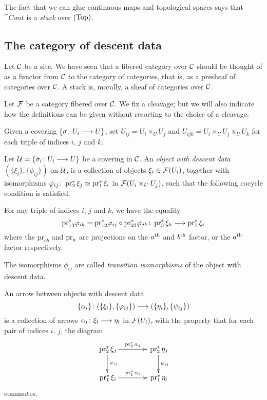\begin{4   STACKS}
\begin{4.1 Descent of objects of fibcats}
The fact that we can glue continuous maps and topological spaces says that $\cat{Cont}$ is a \emph{stack} over $(\mathrm{Top})$.



\subsection{The category of descent data}\label{subsec:descent-data}

Let $\mathcal{C}$ be a site. We have seen that a fibered category over $\mathcal{C}$ should be thought of as a functor from $\mathcal{C}$ to the category of categories, that is, as a presheaf of categories over $\mathcal{C}$. A stack is, morally, a sheaf of categories over $\mathcal{C}$.

Let $\mathcal{F}$ be a category fibered over $\mathcal{C}$. We fix a cleavage; but we will also indicate how the definitions can be given without resorting to the choice of a cleavage.

Given a covering $\{\sigma \colon U_i \arr U\}$, set $U_{ij} = U_i \times_U U_j$ and $U_{ijk} = U_i \times_U U_j \times_U U_k$ for each triple of indices $i$, $j$ and $k$.

\begin{definition}

Let $\cU = \{\sigma_i \colon U_i \arr U\}$ be a covering in $\mathcal{C}$. An \emph{object with descent data}%
 $(\{\xi_i\}, \{\phi_{ij}\})$ on $\mathcal{U}$, is a collection of objects $\xi_i \in \mathcal{F}(U_i)$, together with isomorphisms $\varphi_{ij} \colon \operatorname{pr}_2^* \xi_j \simeq \operatorname{pr}_1^* \xi_i$ in $\mathcal{F}(U_i \times_U U_j)$, such that the following cocycle condition is satisfied.

For any triple of indices $i$, $j$ and $k$, we have the equality
   \[
   \mathrm{pr}_{13}^* \phi_{ik} = \mathrm{pr}_{12}^* \phi_{ij}
   \circ \mathrm{pr}_{23}^* \phi_{jk} \colon \pr_3^*\xi_k
   \arr \pr_1^*\xi_i
   \]
where the $\mathrm{pr}_{ab}$ and $\operatorname{pr}_a$ are projections on the $a^\text{th}$ and $b^\text{th}$ factor, or the $a^\text{th}$ factor respectively.

The isomorphisms $\phi_{ij}$ are called \emph{transition isomorphisms}%
 of the object with descent data.

An arrow between objects with descent data
   \[
   \{\alpha_i\} \colon (\{\xi_i\}, \{\phi_{ij}\}) \arr
   (\{\eta_i\}, \{\psi_{ij}\})
   \]
is a collection of arrows $\alpha_i\colon \xi_i \arr \eta_i$ in $\mathcal{F}(U_i)$, with the property that for each pair of indices $i$, $j$, the diagram
   \[
   \xymatrix@C+15pt{
   {}\pr_2^* \xi_j \ar[r]^{\pr_2^* \alpha_j} \ar[d]^{\phi_{ij}}
   & {}\pr_2^* \eta_j\ar[d]^{\psi_{ij}}\\
   {}\pr_1^* \xi_i \ar[r]^{\pr_1^* \alpha_i}&
   {}\pr_1^* \eta_i
   }
   \]
commutes.


\end{definition}
\end{4.1 Descent of objects of fibcats}
\end{4   STACKS}
